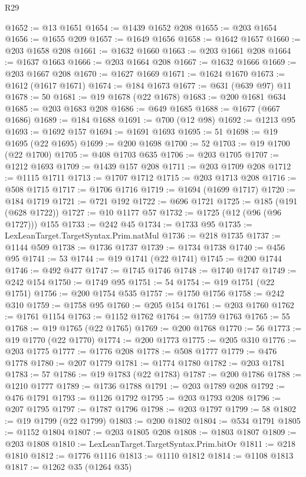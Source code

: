\begin{lexlean}{R29}
\begin{coremodule}
@1652 := @13 @1651
@1654 := @1439 @1652 @208
@1655 := @203 @1654
@1656 := @1655 @209
@1657 := @1649 @1656
@1658 := @1642 @1657
@1660 := @203 @1658 @208
@1661 := @1632 @1660
@1663 := @203 @1661 @208
@1664 := @1637 @1663
@1666 := @203 @1664 @208
@1667 := @1632 @1666
@1669 := @203 @1667 @208
@1670 := @1627 @1669
@1671 := @1624 @1670
@1673 := @1612 (@1617 @1671)
@1674 := @184 @1673
@1677 := @631 (@639 @97) @11
@1678 := 50
@1681 := @19 @1678 (@22 @1678)
@1683 := @200 @1681 @634
@1685 := @203 @1683 @208
@1686 := @649 @1685
@1688 := @1677 (@667 @1686)
@1689 := @184 @1688
@1691 := @700 (@12 @98)
@1692 := @1213 @95
@1693 := @1692 @157
@1694 := @1691 @1693
@1695 := 51
@1698 := @19 @1695 (@22 @1695)
@1699 := @200 @1698
@1700 := 52
@1703 := @19 @1700 (@22 @1700)
@1705 := @408 @1703 @635
@1706 := @203 @1705
@1707 := @1212 @1693
@1709 := @1439 @157 @208
@1711 := @203 @1709 @208
@1712 := @1115 @1711
@1713 := @1707 @1712
@1715 := @203 @1713 @208
@1716 := @508 @1715
@1717 := @1706 @1716
@1719 := @1694 (@1699 @1717)
@1720 := @184 @1719
@1721 := @721 @192
@1722 := @696 @1721
@1725 := @185 (@191 (@628 @1722))
@1727 := @10 @1177 @57
@1732 := @1725 (@12 (@96 (@96 @1727))) @155
@1733 := @242 @45
@1734 := @1733 @95
@1735 := LexLeanTarget.TargetSyntax.Prim.natMul
@1736 := @218 @1735
@1737 := @1144 @509
@1738 := @1736 @1737
@1739 := @1734 @1738
@1740 := @456 @95
@1741 := 53
@1744 := @19 @1741 (@22 @1741)
@1745 := @200 @1744
@1746 := @492 @477
@1747 := @1745 @1746
@1748 := @1740 @1747
@1749 := @242 @154
@1750 := @1749 @95
@1751 := 54
@1754 := @19 @1751 (@22 @1751)
@1756 := @200 @1754 @535
@1757 := @1750 @1756
@1758 := @242 @310
@1759 := @1758 @95
@1760 := @205 @154
@1761 := @203 @1760
@1762 := @1761 @1154
@1763 := @1152 @1762
@1764 := @1759 @1763
@1765 := 55
@1768 := @19 @1765 (@22 @1765)
@1769 := @200 @1768
@1770 := 56
@1773 := @19 @1770 (@22 @1770)
@1774 := @200 @1773
@1775 := @205 @310
@1776 := @203 @1775
@1777 := @1776 @208
@1778 := @508 @1777
@1779 := @476 @1778
@1780 := @207 @1779
@1781 := @1774 @1780
@1782 := @203 @1781
@1783 := 57
@1786 := @19 @1783 (@22 @1783)
@1787 := @200 @1786
@1788 := @1210 @1777
@1789 := @1736 @1788
@1791 := @203 @1789 @208
@1792 := @476 @1791
@1793 := @1126 @1792
@1795 := @203 @1793 @208
@1796 := @207 @1795
@1797 := @1787 @1796
@1798 := @203 @1797
@1799 := 58
@1802 := @19 @1799 (@22 @1799)
@1803 := @200 @1802
@1804 := @534 @1791
@1805 := @1152 @1804
@1807 := @203 @1805 @208
@1808 := @1803 @1807
@1809 := @203 @1808
@1810 := LexLeanTarget.TargetSyntax.Prim.bitOr
@1811 := @218 @1810
@1812 := @1776 @1116
@1813 := @1110 @1812
@1814 := @1108 @1813
@1817 := @1262 @35 (@1264 @35)

\end{coremodule}
\end{lexlean}
